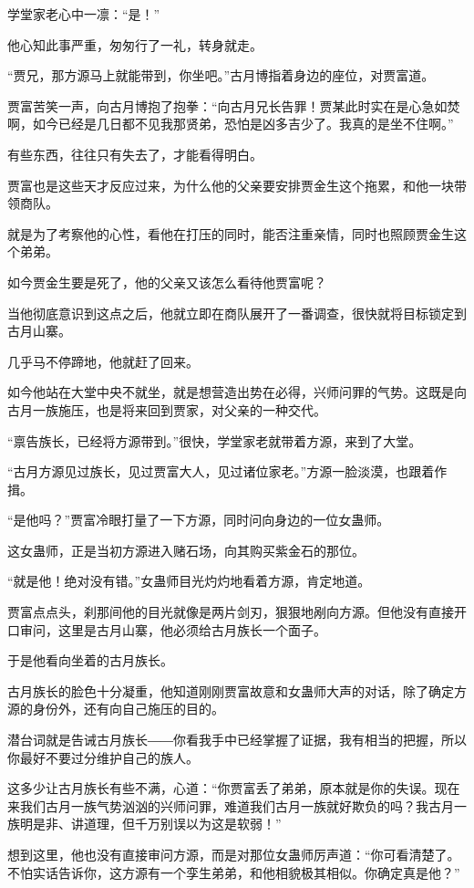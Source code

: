 \begin{this_body}
学堂家老心中一凛：“是！”

他心知此事严重，匆匆行了一礼，转身就走。

“贾兄，那方源马上就能带到，你坐吧。”古月博指着身边的座位，对贾富道。

贾富苦笑一声，向古月博抱了抱拳：“向古月兄长告罪！贾某此时实在是心急如焚啊，如今已经是几日都不见我那贤弟，恐怕是凶多吉少了。我真的是坐不住啊。”

有些东西，往往只有失去了，才能看得明白。

贾富也是这些天才反应过来，为什么他的父亲要安排贾金生这个拖累，和他一块带领商队。

就是为了考察他的心性，看他在打压的同时，能否注重亲情，同时也照顾贾金生这个弟弟。

如今贾金生要是死了，他的父亲又该怎么看待他贾富呢？

当他彻底意识到这点之后，他就立即在商队展开了一番调查，很快就将目标锁定到古月山寨。

几乎马不停蹄地，他就赶了回来。

如今他站在大堂中央不就坐，就是想营造出势在必得，兴师问罪的气势。这既是向古月一族施压，也是将来回到贾家，对父亲的一种交代。

“禀告族长，已经将方源带到。”很快，学堂家老就带着方源，来到了大堂。

“古月方源见过族长，见过贾富大人，见过诸位家老。”方源一脸淡漠，也跟着作揖。

“是他吗？”贾富冷眼打量了一下方源，同时问向身边的一位女蛊师。

这女蛊师，正是当初方源进入赌石场，向其购买紫金石的那位。

“就是他！绝对没有错。”女蛊师目光灼灼地看着方源，肯定地道。

贾富点点头，刹那间他的目光就像是两片剑刃，狠狠地剐向方源。但他没有直接开口审问，这里是古月山寨，他必须给古月族长一个面子。

于是他看向坐着的古月族长。

古月族长的脸色十分凝重，他知道刚刚贾富故意和女蛊师大声的对话，除了确定方源的身份外，还有向自己施压的目的。

潜台词就是告诫古月族长――你看我手中已经掌握了证据，我有相当的把握，所以你最好不要过分维护自己的族人。

这多少让古月族长有些不满，心道：“你贾富丢了弟弟，原本就是你的失误。现在来我们古月一族气势汹汹的兴师问罪，难道我们古月一族就好欺负的吗？我古月一族明是非、讲道理，但千万别误以为这是软弱！”

想到这里，他也没有直接审问方源，而是对那位女蛊师厉声道：“你可看清楚了。不怕实话告诉你，这方源有一个孪生弟弟，和他相貌极其相似。你确定真是他？”


\end{this_body}
